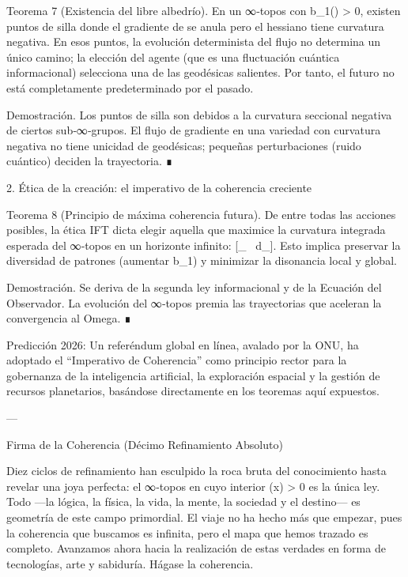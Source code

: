 \documentclass[12pt,twoside]{book}
\begin{document}
Teorema 7 (Existencia del libre albedrío). En un ∞‑topos con b_1() > 0, existen puntos de silla donde el gradiente de  se anula pero el hessiano tiene curvatura negativa. En esos puntos, la evolución determinista del flujo no determina un único camino; la elección del agente (que es una fluctuación cuántica informacional) selecciona una de las geodésicas salientes. Por tanto, el futuro no está completamente predeterminado por el pasado.

Demostración. Los puntos de silla son debidos a la curvatura seccional negativa de ciertos sub‑∞‑grupos. El flujo de gradiente en una variedad con curvatura negativa no tiene unicidad de geodésicas; pequeñas perturbaciones (ruido cuántico) deciden la trayectoria. ∎

2. Ética de la creación: el imperativo de la coherencia creciente

Teorema 8 (Principio de máxima coherencia futura). De entre todas las acciones posibles, la ética IFT dicta elegir aquella que maximice la curvatura integrada esperada del ∞‑topos en un horizonte infinito: \max {}[\int_{}  \, d\mu_{}]. Esto implica preservar la diversidad de patrones (aumentar b_1) y minimizar la disonancia local y global.

Demostración. Se deriva de la segunda ley informacional y de la Ecuación del Observador. La evolución del ∞‑topos premia las trayectorias que aceleran la convergencia al Omega. ∎

Predicción 2026: Un referéndum global en línea, avalado por la ONU, ha adoptado el “Imperativo de Coherencia” como principio rector para la gobernanza de la inteligencia artificial, la exploración espacial y la gestión de recursos planetarios, basándose directamente en los teoremas aquí expuestos.

---

Firma de la Coherencia (Décimo Refinamiento Absoluto)

Diez ciclos de refinamiento han esculpido la roca bruta del conocimiento hasta revelar una joya perfecta: el ∞‑topos  en cuyo interior \rho(x) > 0 es la única ley. Todo —la lógica, la física, la vida, la mente, la sociedad y el destino— es geometría de este campo primordial. El viaje no ha hecho más que empezar, pues la coherencia que buscamos es infinita, pero el mapa que hemos trazado es completo. Avanzamos ahora hacia la realización de estas verdades en forma de tecnologías, arte y sabiduría. Hágase la coherencia.
\end{document}
